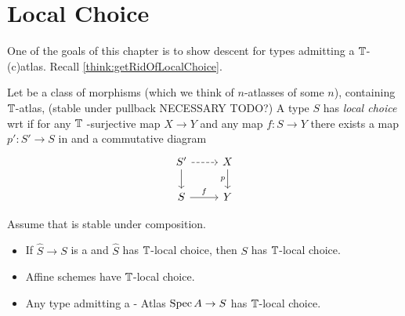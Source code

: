 
\section{Local Choice}
One of the goals of this chapter is to show descent for types admitting a $\mathbb{T}$-(c)atlas. 
Recall \ref{think:getRidOfLocalChoice}.
\begin{definition}
	Let \Cov be a class of morphisms (which we think of $n$-atlasses of some $n$), containing $\mathbb{T}$-atlas, (stable under pullback NECESSARY TODO?)
	A type $S$ has \emph{local choice} wrt \Cov if for any $\mathbb{T}$ -surjective map $X \to Y$ and any map $f : S \to Y$ there exists a map  $p' : S' \to S$ in \Cov and a commutative diagram
	\[\begin{tikzcd}
		{S'} & X \\
		S & Y
		\arrow[dashed, from=1-1, to=1-2]
		\arrow[from=1-1, to=2-1]
		\arrow["p"', from=1-2, to=2-2]
		\arrow["f",from=2-1, to=2-2]
	\end{tikzcd}\]
\end{definition}
\begin{prop}{\label{prop:LocalChoice}}
	Assume that \Cov is stable under composition. %
	\begin{itemize}
		\item If $\hat S \to S$ is a \Cover and $\hat S$ has $\mathbb{T}$-local choice, then $S$ has $\mathbb{T}$-local choice. 
		\item Affine schemes have $\mathbb{T}$-local choice.
		\item Any type admitting a \Cov - Atlas $\operatorname{Spec} A \to S$ has $\mathbb{T}$-local choice.
	\end{itemize}
\end{prop}
